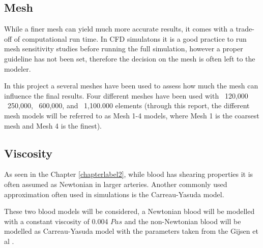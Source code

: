 \subsection{Mesh}
While a finer mesh can yield much more accurate results, it comes with a trade-off of computational run time. In CFD simulatons it is a good practice to run mesh sensitivity studies before running the full simulation, however a proper guideline has not been set, therefore the decision on the mesh is often left to the modeler.\par

In this project a several meshes have been used to  assess how much the mesh can influence the final results. Four different meshes have been used with ~120,000 ~250,000, ~600,000, and ~1,100.000 elements (through this report, the different mesh models will be referred to as Mesh 1-4 models, where Mesh 1 is the coarsest mesh and Mesh 4 is the finest).\par

\subsection{Viscosity}
As seen in the Chapter \ref{chapterlabel2}, while blood has shearing properties it is often assumed as Newtonian in larger arteries. Another commonly used approximation often used in simulations is the Carreau-Yasuda model. \par

These two blood models will be considered, a Newtonian blood will be modelled with a constant viscosity of 0.004 $Pa s$ and the non-Newtonian blood will be modelled as Carreau-Yasuda model with the parameters taken from the Gijsen et al \cite{Gijsen1999TheModel}.


